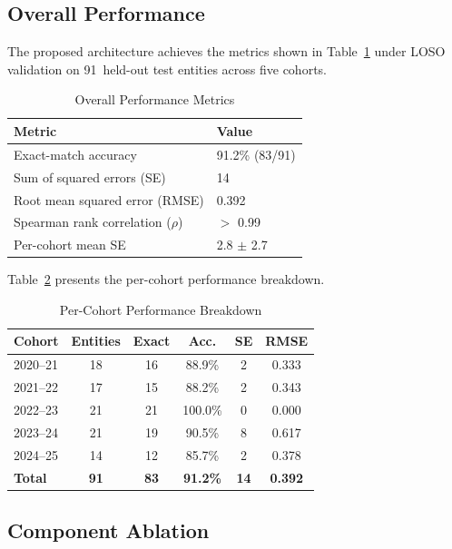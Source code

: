 \documentclass[conference]{IEEEtran}
\begin{document}
\subsection{Overall Performance}

The proposed architecture achieves the metrics shown in Table~\ref{tab:overall} under LOSO validation on 91~held-out test entities across five cohorts.

\begin{table}[htbp]
\centering
\caption{Overall Performance Metrics}
\label{tab:overall}
\begin{tabular}{@{}ll@{}}
\toprule
\textbf{Metric} & \textbf{Value} \\
\midrule
Exact-match accuracy & 91.2\% (83/91) \\
Sum of squared errors (SE) & 14 \\
Root mean squared error (RMSE) & 0.392 \\
Spearman rank correlation ($\rho$) & $>$ 0.99 \\
Per-cohort mean SE & 2.8 $\pm$ 2.7 \\
\bottomrule
\end{tabular}
\end{table}

Table~\ref{tab:per_cohort} presents the per-cohort performance breakdown.

\begin{table}[htbp]
\centering
\caption{Per-Cohort Performance Breakdown}
\label{tab:per_cohort}
\begin{tabular}{@{}lccccc@{}}
\toprule
\textbf{Cohort} & \textbf{Entities} & \textbf{Exact} & \textbf{Acc.} & \textbf{SE} & \textbf{RMSE} \\
\midrule
2020--21 & 18 & 16 & 88.9\% & 2 & 0.333 \\
2021--22 & 17 & 15 & 88.2\% & 2 & 0.343 \\
2022--23 & 21 & 21 & 100.0\% & 0 & 0.000 \\
2023--24 & 21 & 19 & 90.5\% & 8 & 0.617 \\
2024--25 & 14 & 12 & 85.7\% & 2 & 0.378 \\
\midrule
\textbf{Total} & \textbf{91} & \textbf{83} & \textbf{91.2\%} & \textbf{14} & \textbf{0.392} \\
\bottomrule
\end{tabular}
\end{table}

\subsection{Component Ablation}
\end{document}
